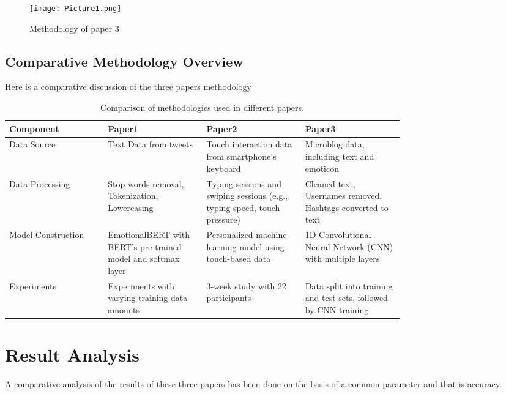 \documentclass[12pt]{article} %
\begin{document}
    \begin{figure}[h!]
    \centering
    \texttt{[image: Picture1.png]}                    
    \caption{Methodology of paper 3 }                              
    \label{Methodology of paper 3}
    \end{figure}   

\subsection{Comparative Methodology Overview} 
Here is a comparative discussion of the three papers methodology
\begin{table}[h!]
  \centering
    \caption{Comparison of methodologies used in different papers.}
  \begin{tabular}{|l|p{0.25\linewidth}|p{0.25\linewidth}|p{0.25\linewidth}|}
    \hline
    \textbf{Component} & \textbf{Paper1} & \textbf{Paper2} & \textbf{Paper3} \\ 
    \hline
    Data Source & Text Data from tweets & Touch interaction data from smartphone's keyboard & Microblog data, including text and emoticon \\
    \hline
    Data Processing & Stop words removal, Tokenization, Lowercasing & Typing sessions and swiping sessions (e.g., typing speed, touch pressure) & Cleaned text, Usernames removed, Hashtags converted to text \\ 
    \hline
    Model Construction & EmotionalBERT with BERT's pre-trained model and softmax layer & Personalized machine learning model using touch-based data & 1D Convolutional Neural Network (CNN) with multiple layers\\                      
    \hline
    Experiments & Experiments with varying training data amounts & 3-week study with 22 participants & Data split into training and test sets, followed by CNN training \\
    \hline
  \end{tabular}                      
  
  \label{tab:my_label}
\end{table}                    
                        

\section{Result Analysis }

A comparative analysis of the results of these three papers has been done on the basis of a common parameter and that is accuracy.
\end{document}
